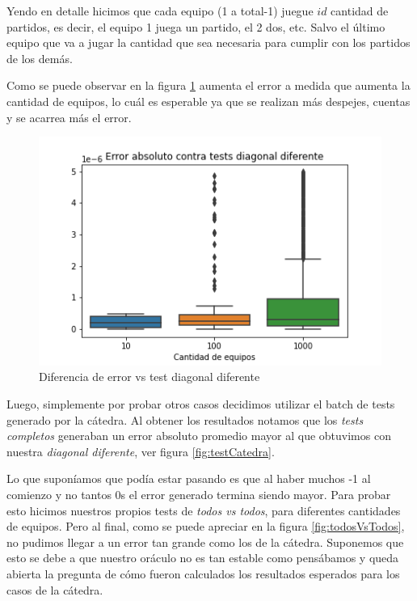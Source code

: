 Yendo en detalle hicimos que cada equipo (1 a total-1) juegue $id$ cantidad de partidos, es decir, el equipo 1 juega un partido, el 2 dos, etc. Salvo el último equipo que va a jugar la cantidad que sea necesaria para cumplir con los partidos de los demás.

Como se puede observar en la figura \ref{fig:bienDiferenteEnDiagonal} aumenta el error a medida que aumenta la cantidad de equipos, lo cuál es esperable ya que se realizan más despejes, cuentas y se acarrea más el error.\\

\begin{figure}[H]
 \centering
 \includegraphics[scale=0.7]{imagenes/bienDiferenteEnDiagonal.png}
 \caption{Diferencia de error vs test diagonal diferente}
 \label{fig:bienDiferenteEnDiagonal}
\end{figure}

Luego, simplemente por probar otros casos decidimos utilizar el batch de tests generado por la cátedra. Al obtener los resultados notamos que los \textit{tests completos} generaban un error absoluto promedio mayor al que obtuvimos con nuestra \textit{diagonal diferente}, ver figura \ref{fig:testCatedra}.

Lo que suponíamos que podía estar pasando es que al haber muchos -1 al comienzo y no tantos 0s el error generado termina siendo mayor. Para probar esto hicimos nuestros propios tests de \textit{todos vs todos}, para diferentes cantidades de equipos. Pero al final, como se puede apreciar en la figura \ref{fig:todosVsTodos}, no pudimos llegar a un error tan grande como los de la cátedra. Suponemos que esto se debe a que nuestro oráculo no es tan estable como pensábamos y queda abierta la pregunta de cómo fueron calculados los resultados esperados para los casos de la cátedra.

